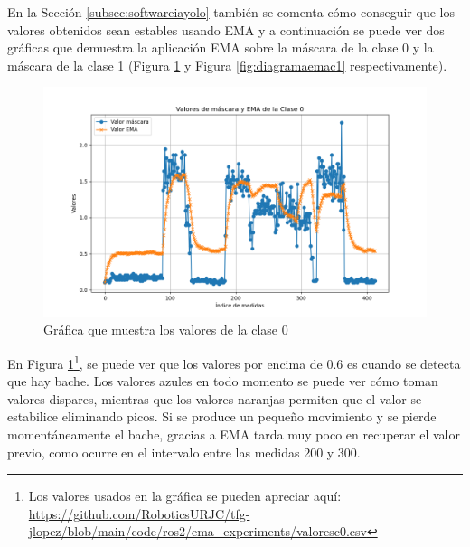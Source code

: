 En la Sección \ref{subsec:softwareiayolo} también se comenta cómo conseguir que los valores obtenidos sean estables usando \acs{EMA} y a continuación se puede ver dos gráficas que demuestra la aplicación EMA sobre la máscara de la clase 0 y la máscara de la clase 1 (Figura \ref{fig:diagramaemac0} y Figura \ref{fig:diagramaemac1} respectivamente).

\begin{figure} [h!]
	\begin{center}
			\includegraphics[width=15cm]{figs/cap7/GraficaC0.png}
		\end{center}
	\caption{Gráfica que muestra los valores de la clase 0}
	\label{fig:diagramaemac0}
\end{figure}

En Figura \ref{fig:diagramaemac0}\footnote{Los valores usados en la gráfica se pueden apreciar aquí: \url{https://github.com/RoboticsURJC/tfg-jlopez/blob/main/code/ros2/ema_experiments/valoresc0.csv}}, se puede ver que los valores por encima de 0.6 es cuando se detecta que hay bache. Los valores azules en todo momento se puede ver cómo toman valores dispares, mientras que los valores naranjas permiten que el valor se estabilice eliminando picos. Si se produce un pequeño movimiento y se pierde momentáneamente el bache, gracias a EMA tarda muy poco en recuperar el valor previo, como ocurre en el intervalo entre las medidas 200 y 300.

